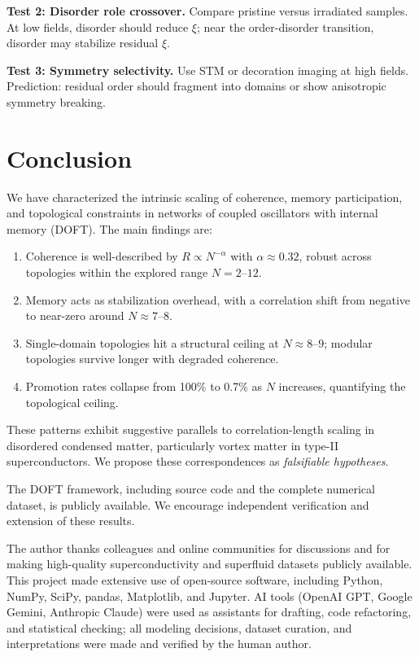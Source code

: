 \documentclass[reprint,aps,prb,superscriptaddress,floatfix]{revtex4-2}
\begin{document}
\textbf{Test 2: Disorder role crossover.} Compare pristine versus irradiated samples. At low fields, disorder should reduce $\xi$; near the order-disorder transition, disorder may stabilize residual $\xi$.

\textbf{Test 3: Symmetry selectivity.} Use STM or decoration imaging at high fields. Prediction: residual order should fragment into domains or show anisotropic symmetry breaking.

\section{Conclusion}

We have characterized the intrinsic scaling of coherence, memory participation, and topological constraints in networks of coupled oscillators with internal memory (DOFT). The main findings are:

\begin{enumerate}
\item Coherence is well-described by $R \propto N^{-\alpha}$ with $\alpha \approx 0.32$, robust across topologies within the explored range $N = 2$--$12$.
\item Memory acts as stabilization overhead, with a correlation shift from negative to near-zero around $N \approx 7$--$8$.
\item Single-domain topologies hit a structural ceiling at $N \approx 8$--$9$; modular topologies survive longer with degraded coherence.
\item Promotion rates collapse from 100\% to 0.7\% as $N$ increases, quantifying the topological ceiling.
\end{enumerate}

These patterns exhibit suggestive parallels to correlation-length scaling in disordered condensed matter, particularly vortex matter in type-II superconductors. We propose these correspondences as \emph{falsifiable hypotheses}.

The DOFT framework, including source code and the complete numerical dataset, is publicly available. We encourage independent verification and extension of these results.

\begin{acknowledgments}
The author thanks colleagues and online communities for discussions and for making high-quality superconductivity and superfluid datasets publicly available. This project made extensive use of open-source software, including Python, NumPy, SciPy, pandas, Matplotlib, and Jupyter. AI tools (OpenAI GPT, Google Gemini, Anthropic Claude) were used as assistants for drafting, code refactoring, and statistical checking; all modeling decisions, dataset curation, and interpretations were made and verified by the human author.
\end{acknowledgments}
\end{document}
